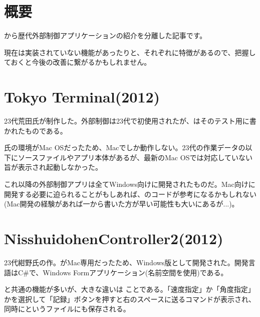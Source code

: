 \documentclass[letterpaper,10pt,dvipdfmx]{sphinxmanual}
\begin{document}
\section{概要}
\label{\detokenize{nissyu-idohen/pc-software-history:}}\label{\detokenize{nissyu-idohen/pc-software-history:id2}}
{\hyperref[\detokenize{nissyu-idohen/pc-software::doc}]{}}から歴代外部制御アプリケーションの紹介を分離した記事です。

現在は実装されていない機能があったりと、それぞれに特徴があるので、把握しておくと今後の改善に繋がるかもしれません。


\section{Tokyo Terminal(2012)}
\label{\detokenize{nissyu-idohen/pc-software-history:tokyo-terminal-2012}}

23代荒田氏が制作した。外部制御は23代で初使用されたが、はそのテスト用に書かれたものである。

氏の環境がMac OSだったため、Macでしか動作しない。23代の作業データの以下にソースファイルやアプリ本体があるが、最新のMac OSでは対応していない旨が表示され起動しなかった。

これ以降の外部制御アプリは全てWindows向けに開発されたものだ。Mac向けに開発する必要に迫られることがもしあれば、のコードが参考になるかもしれない(Mac開発の経験があれば一から書いた方が早い可能性も大いにあるが...)。


\section{NisshuidohenController2(2012)}
\label{\detokenize{nissyu-idohen/pc-software-history:nisshuidohencontroller2-2012}}

23代紺野氏の作。がMac専用だったため、Windows版として開発された。開発言語はC\#で、Windows Formアプリケーション(名前空間を使用)である。

と共通の機能が多いが、大きな違いは ことである。「速度指定」か「角度指定」かを選択して「記録」ボタンを押すと右のスペースに送るコマンドが表示され、同時にというファイルにも保存される。
\end{document}
